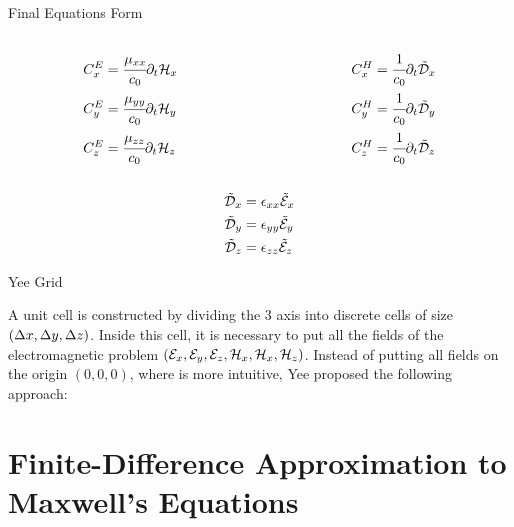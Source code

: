 \documentclass{beamer}
\begin{document}
\begin{frame}{Final Equations Form}
  \begin{columns}
    \begin{column}{0.45\textwidth}
      \begin{align}
        C_x^E &= \cfrac{\mu_{xx}}{c_0} \partial_t \mathcal{H}_x \\
        C_y^E &= \cfrac{\mu_{yy}}{c_0} \partial_t \mathcal{H}_y\\
        C_z^E &= \cfrac{\mu_{zz}}{c_0} \partial_t \mathcal{H}_z
    \end{align}
    \end{column}
    \begin{column}{0.45\textwidth}
      \begin{align}
        C_x^H &= \cfrac{1}{c_0} \partial_t \tilde{\mathcal{D}}_x \\
        C_y^H &= \cfrac{1}{c_0} \partial_t \tilde{\mathcal{D}}_y \\
        C_z^H &= \cfrac{1}{c_0} \partial_t \tilde{\mathcal{D}}_z
    \end{align}
    \end{column}

  \end{columns}

  \begin{align}
    \tilde{\mathcal{D}}_x &= \epsilon_{xx} \tilde{\mathcal{E}}_x \label{eq:dnx_update} \\
    \tilde{\mathcal{D}}_y &= \epsilon_{yy} \tilde{\mathcal{E}}_y \label{eq:dny_update} \\
    \tilde{\mathcal{D}}_z &= \epsilon_{zz} \tilde{\mathcal{E}}_z \label{eq:dnz_update}
\end{align}
\end{frame}

\begin{frame}{Yee Grid}
  
A unit cell is constructed by dividing the 3 axis into discrete cells of size $(\Delta x, \Delta y, \Delta z)$. Inside this cell, it is necessary to put all the fields of the electromagnetic problem $(\mathcal{E}_x, \mathcal{E}_y, \mathcal{E}_z, \mathcal{H}_x, \mathcal{H}_x, \mathcal{H}_z)$. Instead of putting all fields on the origin $(0, 0, 0)$, where is more intuitive, Yee proposed the following approach:

\centering


\end{frame}

\section{Finite-Difference Approximation to Maxwell's Equations}
\end{document}
